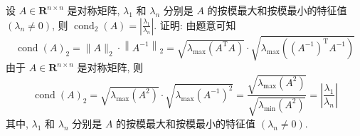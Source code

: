  \begin{tcolorbox}[enhanced,colback=10,colframe=9,breakable,coltitle=green!25!black,title=2024]

设 $ A \in \mathbf{R}^{n \times n} $ 是对称矩阵, $ \lambda_{1} $ 和 $ \lambda_{n} $ 分别是 $ A $ 的按模最大和按模最小的特征值 $ \left(\lambda_{n} \neq 0\right) $, 则 $ \operatorname{cond}_{2}(A)=\left|\frac{\lambda_{1}}{\lambda_{n}}\right| $.
 \tcblower
证明: 由题意可知
$$
\operatorname{cond}(A)_{2}=\|A\|_{2} \cdot\left\|A^{-1}\right\|_{2}=\sqrt{\lambda_{\max }\left(A^{\mathrm{T}} A\right)} \cdot \sqrt{\lambda_{\max }\left(\left(A^{-1}\right)^{\mathrm{T}} A^{-1}\right)}
$$
由于 $ A \in \mathbf{R}^{n \times n} $ 是对称矩阵, 则
$$
\operatorname{cond}(A)_{2}=\sqrt{\lambda_{\max }\left(A^{2}\right)} \cdot \sqrt{\lambda_{\max }\left(A^{-1}\right)^{2}}=\frac{\sqrt{\lambda_{\max }\left(A^{2}\right)}}{\sqrt{\lambda_{\min }\left(A^{2}\right)}}=\left|\frac{\lambda_{1}}{\lambda_{n}}\right|
$$
其中, $ \lambda_{1} $ 和 $ \lambda_{n} $ 分别是 $ A $ 的按模最大和按模最小的特征值 $ \left(\lambda_{n} \neq 0\right) $.

 \end{tcolorbox}


